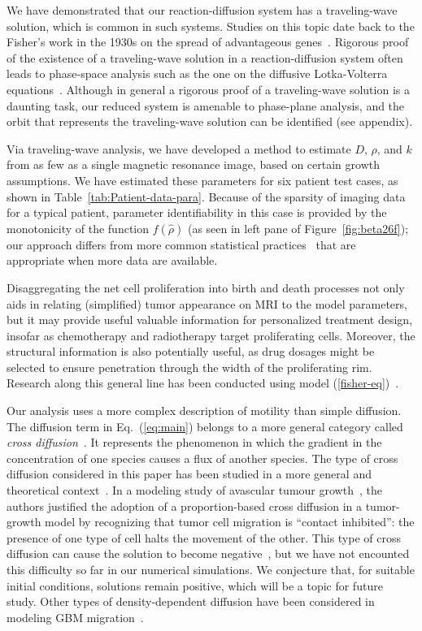 \documentclass{aims}
\numberwithin{equation}{section}
\begin{document}
We have demonstrated that our reaction-diffusion system has a traveling-wave solution,
which is common in such systems.
Studies on this topic date back to the Fisher's work in the 1930s on the spread of
advantageous genes~\cite{Fisher1937}. Rigorous
proof of the existence of a traveling-wave solution in a reaction-diffusion
system often leads to phase-space analysis such as the one on the diffusive
Lotka-Volterra equations~\cite{Dunbar1983}.  Although in general a rigorous
proof of a traveling-wave solution is a daunting task, our reduced system is
amenable to phase-plane analysis, and the orbit that represents
the traveling-wave solution can be identified (see appendix).

Via traveling-wave analysis, we have developed a method to estimate $D$, $\rho$, and
$k$ from as few as a single magnetic resonance image, based on certain growth
assumptions. We have estimated these parameters for six
patient test cases, as shown in Table~\ref{tab:Patient-data-para}. Because of the
sparsity of imaging data for a typical patient,
parameter identifiability in this case is provided
by the monotonicity of the function  $f(\hat\rho)$ (as seen in left pane of
Figure~\ref{fig:beta26f});  our approach differs from more common statistical
practices~\cite{Eisenberg2017} that are appropriate when more data are available. 
   
Disaggregating the net cell proliferation into birth and death processes not only
aids in relating (simplified) tumor appearance on MRI to the model parameters, but
it may provide useful valuable information for personalized treatment
design, insofar as chemotherapy and radiotherapy target proliferating cells.
Moreover, the structural information is also potentially useful, as drug dosages
might be selected to ensure penetration through the width
of the proliferating rim. Research along this general line has been conducted using
model (\ref{fisher-eq})~\cite{Kim2017}.

Our analysis uses a more complex description of motility than simple diffusion.
The diffusion term in Eq.~(\ref{eq:main}) belongs to a more general category called
\emph{cross diffusion}~\cite{Madzvamuse2017}.  It represents the phenomenon in which
the gradient in the concentration of one species causes a flux
of another species.  The type of cross diffusion considered in this paper has been
studied in a more general and theoretical context~\cite{Sherratt2000}.  In a
modeling study of avascular tumour growth~\cite{Sherratt2001b}, the authors justified
the adoption of a proportion-based cross diffusion in a tumor-growth model by recognizing
that tumor cell migration is ``contact inhibited'':  the presence
of one type of cell halts the movement of the other. This type of cross diffusion
can cause the solution to become negative~\cite{Madzvamuse2017}, but we have not
encounted this difficulty so far in our numerical simulations.
We conjecture that, for suitable initial conditions,
solutions remain positive, which will be a topic for future study. 
Other types of density-dependent
diffusion have been considered in modeling GBM migration~\cite{Stepien2015}.
\end{document}
